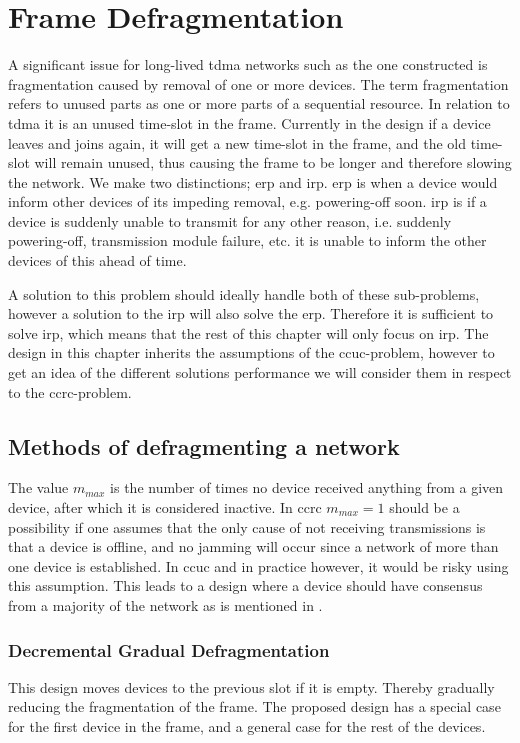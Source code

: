 \section{Frame Defragmentation}
A significant issue for long-lived \gls{tdma} networks such as the one constructed is fragmentation caused by removal of one or more devices. 
The term fragmentation refers to unused parts as one or more parts of a sequential resource. 
In relation to \gls{tdma} it is an unused time-slot in the frame. 
Currently in the design if a device leaves and joins again, it will get a new time-slot in the frame, and the old time-slot will remain unused, thus causing the frame to be longer and therefore slowing the network.
We make two distinctions; \gls{erp} and \gls{irp}.
\gls{erp} is when a device would inform other devices of its impeding removal, e.g. powering-off soon. 
\gls{irp} is if a device is suddenly unable to transmit for any other reason, i.e. suddenly powering-off, transmission module failure, etc. it is unable to inform the other devices of this ahead of time. 

A solution to this problem should ideally handle both of these sub-problems, however a solution to the \gls{irp} will also solve the \gls{erp}.
Therefore it is sufficient to solve \gls{irp}, which means that the rest of this chapter will only focus on \gls{irp}.  
The design in this chapter inherits the assumptions of the \gls{ccuc}-problem, however to get an idea of the different solutions performance we will consider them in respect to the \gls{ccrc}-problem. 

\subsection{Methods of defragmenting a network}

The value $m_{max}$ is the number of times no device received anything from a given device, after which it is considered inactive. 
In \gls{ccrc} $m_{max} = 1$ should be a possibility if one assumes that the only cause of not receiving transmissions is that a device is offline, and no jamming will occur since a network of more than one device is established.
In \gls{ccuc} and in practice however, it would be risky using this assumption.
This leads to a design where a device should have consensus from a majority of the network as is mentioned in .

\subsubsection{Decremental Gradual Defragmentation}
This design moves devices to the previous slot if it is empty. 
Thereby gradually reducing the fragmentation of the frame.
The proposed design has a special case for the first device in the frame, and a general case for the rest of the devices.

